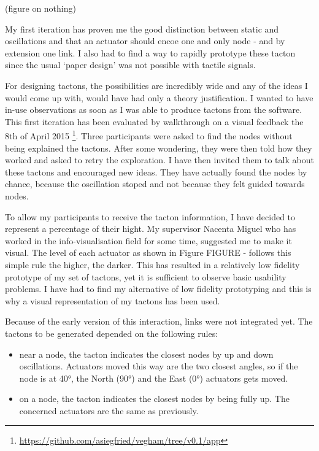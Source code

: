 (figure on nothing)

My first iteration has proven me the good distinction between static and
oscillations and that an actuator should encoe one and only node - and by extension one link. I also
had to find a way to rapidly prototype these tacton since the usual `paper design' was not
possible with tactile signals.

For designing tactons, the possibilities are incredibly wide and any of the ideas I would come up with, would have had only a theory justification. I wanted to have in-use observations as soon as I was able to produce tactons from the software. This first iteration has been evaluated by walkthrough on a visual feedback the 8th of
April 2015 \footnote{\url{https://github.com/asiegfried/vegham/tree/v0.1/app}}. Three participants were asked to find the nodes without being explained the tactons. After some wondering, they were then told how they worked and asked to retry the exploration. I have then invited them to talk about these tactons and encouraged new ideas. They have actually found the nodes by chance, because the oscillation stoped and not because they felt guided towards nodes.

To allow my participants to receive the tacton information, I have decided to represent a percentage of their hight. My supervisor Nacenta Miguel who has worked in the info-visualisation field for some time, suggested me to make it visual. The level of each actuator as shown in Figure FIGURE - follows this simple rule the higher, the darker. This has resulted in a relatively low fidelity
prototype of my set of tactons, yet it is sufficient to observe basic
usability problems. I have had to find my alternative of low fidelity
prototyping and this is why a visual representation of my tactons has been used.

Because of the early version of this interaction, links were not
integrated yet. The tactons to be generated depended on the following
rules:

\begin{itemize}
\item
  near a node, the tacton indicates the closest nodes by up and down
  oscillations. Actuators moved this way are the two closest angles, so
  if the node is at 40°, the North (90°) and the East (0°) actuators
  gets moved.
\item
  on a node, the tacton indicates the closest nodes by being fully up.
  The concerned actuators are the same as previously.
\end{itemize}


